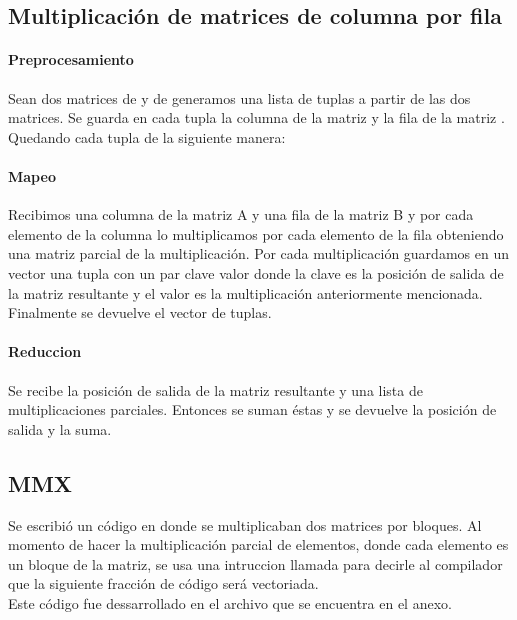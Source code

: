 \subsection{Multiplicación de matrices de columna por fila}

    \paragraph{Preprocesamiento}

        Sean dos matrices  de  y  de 
        generamos una lista de tuplas a partir de las dos matrices.
        Se guarda en cada tupla la columna  de la matriz  y
        la fila  de la matriz . Quedando cada tupla de la
        siguiente manera:\\

    \paragraph{Mapeo}
        Recibimos una columna de la matriz A y una fila de la matriz B y por cada
        elemento de la columna  lo multiplicamos por cada elemento
        de la fila  obteniendo una matriz parcial de la
        multiplicación. Por cada multiplicación guardamos en un vector una tupla
        con un par clave valor donde la clave es la posición de salida de la matriz
        resultante y el valor es la multiplicación anteriormente mencionada.
        Finalmente se devuelve el vector de tuplas.

    \paragraph{Reduccion}

        Se recibe la posición de salida de la matriz resultante y una lista de
        multiplicaciones parciales. Entonces se suman éstas y se devuelve la
        posición de salida y la suma.

\subsection{MMX}
    Se escribió un código en  donde se multiplicaban dos matrices
    por bloques. Al momento de hacer la multiplicación parcial de elementos, donde
    cada elemento es un bloque de la matriz, se usa una intruccion llamada
     para decirle al  compilador que la siguiente
    fracción de código será vectoriada.\\
    Este código fue dessarrollado en el archivo  que
    se encuentra en el anexo.

